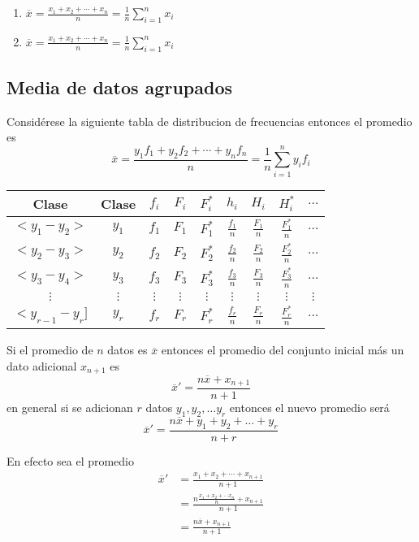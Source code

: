 \documentclass[10pt,]{krantz}
\providecommand{\tightlist}{%
  \setlength{\itemsep}{0pt}\setlength{\parskip}{0pt}}
\theoremstyle{definition}
\theoremstyle{definition}
\theoremstyle{definition}
\theoremstyle{remark}
\let\BeginKnitrBlock\begin \let\EndKnitrBlock\end
\begin{document}
\begin{enumerate}
\def\labelenumi{\arabic{enumi}.}
\tightlist
\item
  \(\overline{x}=\frac{x_1+x_2+\cdots+x_n}{n}=\frac{1}{n}\sum_{i=1}^nx_i\)
\item
  \(\overline{x}=\frac{x_1+x_2+\cdots+x_n}{n}=\frac{1}{n}\sum_{i=1}^nx_i\)
\end{enumerate}

\hypertarget{media-de-datos-agrupados}{%
\subsection{Media de datos agrupados}\label{media-de-datos-agrupados}}

Considérese la siguiente tabla de distribucion de frecuencias entonces el promedio es \[\overline{x}=\frac{y_1f_1+y_2f_2+\cdots+y_nf_n}{n}=\frac{1}{n}\sum_{i=1}^ny_if_i\]

\begin{longtable}[]{@{}ccccccccc@{}}
\toprule
Clase & Clase & \(f_i\) & \(F_i\) & \(F_i^*\) & \(h_i\) & \(H_i\) & \(H_i^*\) & \(\ldots\)\tabularnewline
\midrule
\endhead
\(<y_1-y_2>\) & \(y_1\) & \(f_1\) & \(F_1\) & \(F_1^*\) & \(\frac{f_1}{n}\) & \(\frac{F_1}{n}\) & \(\frac{F_1^*}{n}\) & \(\ldots\)\tabularnewline
\(<y_2-y_3>\) & \(y_2\) & \(f_2\) & \(F_2\) & \(F_2^*\) & \(\frac{f_2}{n}\) & \(\frac{F_2}{n}\) & \(\frac{F_2^*}{n}\) & \(\ldots\)\tabularnewline
\(<y_3-y_4>\) & \(y_3\) & \(f_3\) & \(F_3\) & \(F_3^*\) & \(\frac{f_3}{n}\) & \(\frac{F_3}{n}\) & \(\frac{F_3^*}{n}\) & \(\ldots\)\tabularnewline
\(\vdots\) & \(\vdots\) & \(\vdots\) & \(\vdots\) & \(\vdots\) & \(\vdots\) & \(\vdots\) & \(\vdots\) & \(\vdots\)\tabularnewline
\(<y_{r-1}-y_r]\) & \(y_r\) & \(f_r\) & \(F_r\) & \(F_r^*\) & \(\frac{f_r}{n}\) & \(\frac{F_r}{n}\) & \(\frac{F_r^*}{n}\) & \(...\)\tabularnewline
\bottomrule
\end{longtable}

\BeginKnitrBlock{exercise}
\protect\hypertarget{exr:unnamed-chunk-5}{}{\label{exr:unnamed-chunk-5} }Si el promedio de \(n\) datos es \(\overline{x}\) entonces el promedio del conjunto inicial más un dato adicional \(x_{n+1}\) es \[\overline{x}'=\frac{n\overline{x}+x_{n+1}}{n+1}\] en general si se adicionan \(r\) datos \(y_1, y_2, \ldots y_r\) entonces el nuevo promedio será \[\overline{x}'=\frac{n\overline{x}+y_{1}+y_2+\ldots+y_r}{n+r}\]
\EndKnitrBlock{exercise}

\BeginKnitrBlock{solution}
\iffalse{} {Solución. } \fi{}En efecto sea el promedio
\begin{align*}
\overline{x}'&=\frac{x_1+x_2+\cdots+x_{n+1}}{n+1}\\
&=\frac{n\frac{x_1+x_2+\cdots x_n}{n}+x_{n+1}}{n+1}\\
&=\frac{n\overline{x}+x_{n+1}}{n+1}
\end{align*}
\EndKnitrBlock{solution}
\end{document}
